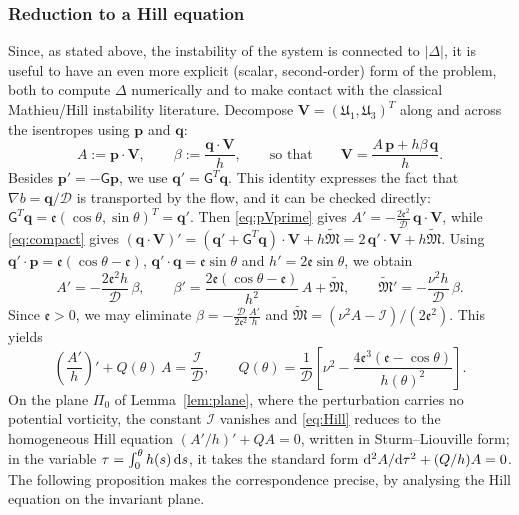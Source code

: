 \documentclass[reqno]{amsart}
\newcommand{\Msf}{\mathsf{G}}
\newcommand{\B}{{\mathfrak{M}}}
\newcommand{\D}{\mathcal{D}}
\newcommand{\ee}{\mathfrak{e}}
\begin{document}
\subsubsection{Reduction to a Hill equation}
Since, as stated above, the instability of the system is connected to $|\Delta|$, it is useful to have an even more explicit (scalar, second-order) form of the problem, both to compute $\Delta$ numerically and to make contact with the classical Mathieu/Hill instability literature. Decompose $\mathbf V=(\mathfrak{U}_1,\mathfrak{U}_3)^T$ along and across the isentropes using $\mathbf p$ and $\mathbf q$:
\[
A:=\mathbf p\cdot\mathbf V,\qquad \beta:=\frac{\mathbf q\cdot\mathbf V}{h},\qquad\text{so that}\qquad \mathbf V=\frac{A\,\mathbf p+h\beta\,\mathbf q}{h}.
\]
Besides $\mathbf p'=-\Msf\mathbf p$, we use $\mathbf q'=\Msf^T\mathbf q$. This identity expresses the fact that $\nabla b=\mathbf q/\D$ is transported by the flow, and it can be checked directly: $\Msf^T\mathbf q=\ee(\cos\theta,\sin\theta)^T=\mathbf q'$. Then \eqref{eq:pVprime} gives $A'=-\frac{2\ee^2}{\D}\,\mathbf q\cdot\mathbf V$, while \eqref{eq:compact} gives $(\mathbf q\cdot\mathbf V)'=(\mathbf q'+\Msf^T\mathbf q)\cdot\mathbf V+h\widetilde{\B}=2\,\mathbf q'\cdot\mathbf V+h\widetilde{\B}$. Using $\mathbf q'\cdot\mathbf p=\ee(\cos\theta-\ee)$, $\mathbf q'\cdot\mathbf q=\ee\sin\theta$ and $h'=2\ee\sin\theta$, we obtain
\begin{equation}\label{eq:Abeta}
A'=-\frac{2\ee^2h}{\D}\,\beta,\qquad
\beta'=\frac{2\ee(\cos\theta-\ee)}{h^2}\,A+\widetilde{\B},\qquad
\widetilde{\B}'=-\frac{\nu^2h}{\D}\,\beta .
\end{equation}
Since $\ee>0$, we may eliminate $\beta=-\frac{\D}{2\ee^2}\frac{A'}{h}$ and $\widetilde{\B}=(\nu^2A-\mathcal I)/(2\ee^2)$. This yields
\begin{equation}\label{eq:Hill}
\left(\frac{A'}{h}\right)'+Q(\theta)\,A=\frac{\mathcal I}{\D},\qquad
Q(\theta)=\frac{1}{\D}\left[\nu^2-\frac{4\ee^3(\ee-\cos\theta)}{h(\theta)^2}\right].
\end{equation}
On the plane $\Pi_0$ of Lemma~\ref{lem:plane}, where the perturbation carries no potential vorticity, the constant $\mathcal I$ vanishes and \eqref{eq:Hill} reduces to the homogeneous Hill equation $(A'/h)'+QA=0$, written in Sturm--Liouville form; in the variable $\tau=\int_0^{\theta}h(s)\,{\rm d}s$, it takes the standard form ${\rm d}^{2}A/{\rm d}\tau^{2}+(Q/h)A=0$. The following proposition makes the correspondence precise, by analysing the Hill equation on the invariant plane.
\end{document}
